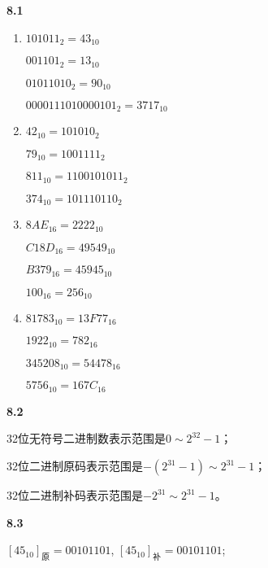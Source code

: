 \documentclass[UTF8]{report}
\begin{document}
\pagestyle{fancy}

\maketitle

\noindent
\textbf{8.1}

\begin{enumerate}[label=(\arabic*)]
    \item $101011_2 = 43_{10}$
    
    $001101_2 = 13_{10}$

    $01011010_2 = 90_{10}$

    $0000111010000101_2 = 3717_{10}$

    \item $42_{10} = 101010_2$
    
    $79_{10} = 1001111_2$

    $811_{10} = 1100101011_2$

    $374_{10} = 101110110_2$

    \item $8AE_{16} = 2222_{10}$
    
    $C18D_{16} = 49549_{10}$

    $B379_{16} = 45945_{10}$

    $100_{16} = 256_{10}$

    \item $81783_{10} = 13F77_{16}$
    
    $1922_{10} = 782_{16}$

    $345208_{10} = 54478_{16}$

    $5756_{10} = 167C_{16}$
\end{enumerate}

\noindent
\textbf{8.2}

32位无符号二进制数表示范围是$0 \sim 2^{32}-1$；

32位二进制原码表示范围是$-(2^{31}-1) \sim 2^{31}-1$；

32位二进制补码表示范围是$-2^{31} \sim 2^{31}-1$。

\noindent
\textbf{8.3}

$[45_{10}]_{\text{原}} = 00101101$, $[45_{10}]_{\text{补}} = 00101101$;
\end{document}

